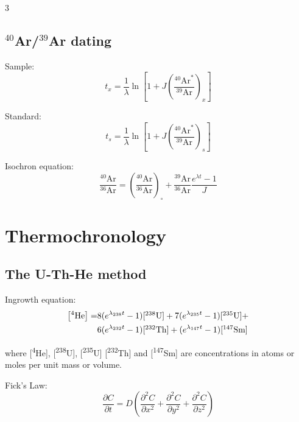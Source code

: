 \documentclass{article}
\begin{document}
\begin{multicols}{3}
\subsection{$^{40}$Ar/$^{39}$Ar dating}
\label{sec:Ar-Ar}

Sample:
\begin{equation}
t_x = \frac{1}{\lambda} \ln\left[
1 + J \left(\frac{^{40}\mbox{Ar}^*}{^{39}\mbox{Ar}}\right)_x 
\right]
\label{eq:Ar-Ar}
\end{equation}

Standard:
\begin{equation}
t_s = \frac{1}{\lambda} \ln\left[
1 + J \left(\frac{^{40}\mbox{Ar}^*}{^{39}\mbox{Ar}}\right)_s 
\right]
\label{eq:J}
\end{equation}

Isochron equation:
\begin{equation}
\frac{{}^{40}\mbox{Ar}}{{}^{36}\mbox{Ar}} =
\left(\frac{{}^{40}\mbox{Ar}}{{}^{36}\mbox{Ar}}\right)_\circ +
\frac{{}^{39}\mbox{Ar}}{{}^{36}\mbox{Ar}}\frac{e^{\lambda t} - 1}{J}
\label{eq:Ar-Ar-isochron}
\end{equation}

\section{Thermochronology}

\subsection{The U-Th-He method}
\label{sec:U-Th-He}

Ingrowth equation:
\begin{equation}
\begin{split}
  \left[^4\mbox{He}\right] = &
  8 (e^{\lambda_{238}t} - 1) \mbox{[\textsuperscript{238}\mbox{U}]} + 
  7 (e^{\lambda_{235}t} - 1) \mbox{[\textsuperscript{235}\mbox{U}]} + \\
  ~ & 6 (e^{\lambda_{232}t} - 1) \mbox{[\textsuperscript{232}\mbox{Th}]} +
  (e^{\lambda_{147}t} - 1) \mbox{[\textsuperscript{147}\mbox{Sm}]}
\end{split}
\label{eq:U-Th-He}
\end{equation}

where [\textsuperscript{4}He], [\textsuperscript{238}U],
[\textsuperscript{235}U] [\textsuperscript{232}Th] and
[\textsuperscript{147}Sm] are concentrations in atoms or moles per
unit mass or volume.

Fick's Law:
\begin{equation}
\frac{\partial C}{\partial t} = D \left(
\frac{\partial^2C}{\partial x^2} + \frac{\partial^2C}{\partial y^2} +
\frac{\partial^2C}{\partial z^2}\right)
\label{eq:fick}
\end{equation}


\end{multicols}
\end{document}
